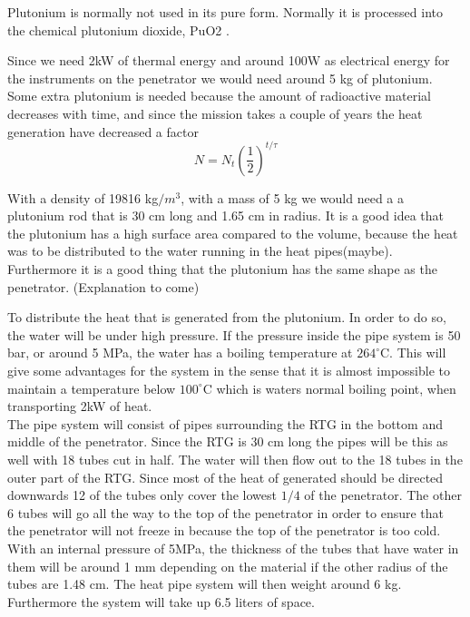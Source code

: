 \noindent
Plutonium is normally not used in its pure form. Normally it is processed into the chemical plutonium dioxide, PuO2 \cite{plutoniumoxide}. 


\noindent
Since we need 2kW of thermal energy and around 100W as electrical energy for the instruments on the penetrator we would need around 5 kg of plutonium. Some extra plutonium is needed because the amount of radioactive material decreases with time, and since the mission takes a couple of years the heat generation have decreased a factor 
\begin{equation}
N = N_t \left(\frac{1}{2}\right)^{t/\tau} 
\end{equation}

\noindent
With a density of 19816 kg$/m^3$, with a mass of 5 kg we would need a a plutonium rod that is 30 cm long and 1.65 cm in radius. It is a good idea that the plutonium has a high surface area compared to the volume, because the heat was to be distributed to the water running in the heat pipes(maybe). Furthermore it is a good thing that the plutonium has the same shape as the penetrator. (Explanation to come) 


To distribute the heat that is generated from the plutonium. In order to do so, the water will be under high pressure. If the pressure inside the pipe system is 50 bar, or around 5 MPa, the water has a boiling temperature at $264^\circ$C. This will give some advantages for the system in the sense that it is almost impossible to maintain a temperature below $100^\circ$C which is waters normal boiling point, when transporting 2kW of heat.\\

\noindent
The pipe system will consist of pipes surrounding the RTG in the bottom and middle of the penetrator. Since the RTG is 30 cm long the pipes will be this as well with 18 tubes cut in half. The water will then flow out to the 18 tubes in the outer part of the RTG. Since most of the heat of generated should be directed downwards 12 of the tubes only cover the lowest $1/4$ of the penetrator. The other 6 tubes will go all the way to the top of the penetrator in order to ensure that the penetrator will not freeze in because the top of the penetrator is too cold. With an internal pressure of 5MPa, the thickness of the tubes that have water in them will be around 1 mm depending on the material if the other radius of the tubes are 1.48 cm. The heat pipe system will then weight around 6 kg. Furthermore the system will take up 6.5 liters of space. 


